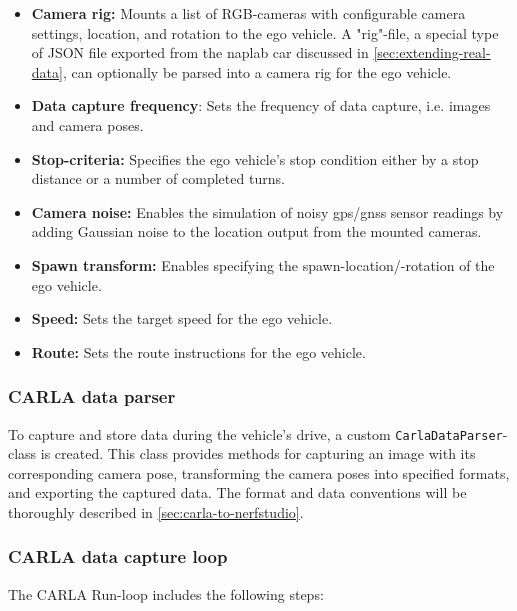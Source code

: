 \begin{itemize}
    \item \textbf{Camera rig:} Mounts a list of RGB-cameras with configurable camera settings, location, and rotation to the ego vehicle. A "rig"-file, a special type of JSON file exported from the \acrshort{naplab} car discussed in \autoref{sec:extending-real-data}, can optionally be parsed into a camera rig for the ego vehicle. 
    \item \textbf{Data capture frequency}: Sets the frequency of data capture, i.e. images and camera poses.
    \item \textbf{Stop-criteria:} Specifies the ego vehicle's stop condition either by a stop distance or a number of completed turns.
    \item \textbf{Camera noise:} Enables the simulation of noisy \acrshort{gps}/\acrshort{gnss} sensor readings by adding Gaussian noise to the location output from the mounted cameras.
    \item \textbf{Spawn transform:} Enables specifying the spawn-location/-rotation of the ego vehicle.
    \item \textbf{Speed:} Sets the target speed for the ego vehicle.
    \item \textbf{Route:} Sets the route instructions for the ego vehicle.
\end{itemize}


\subsubsection{CARLA data parser}

To capture and store data during the vehicle’s drive, a custom \texttt{CarlaDataParser}-class is created. This class provides methods for capturing an image with its corresponding camera pose, transforming the camera poses into specified formats, and exporting the captured data. The format and data conventions will be thoroughly described in \autoref{sec:carla-to-nerfstudio}.

\subsubsection{CARLA data capture loop}
The CARLA Run-loop includes the following steps:

